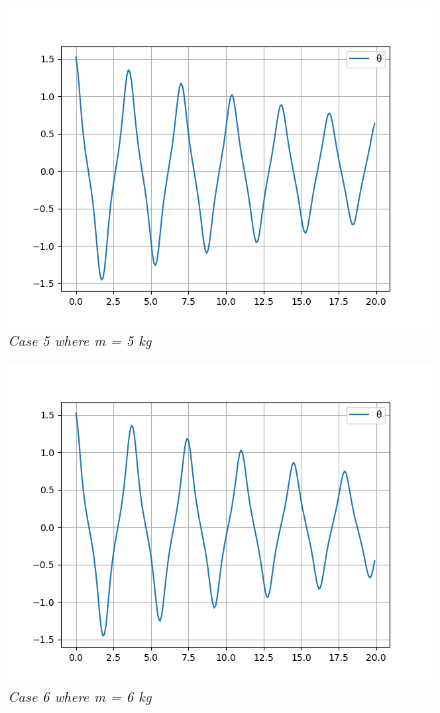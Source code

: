         \begin{figure}[H]
            \centering
            \includegraphics{Appendix/RExpPictures/A/am5.png}
            \caption{\textit{Case 5 where m = 5 kg}}
            \label{}
        \end{figure}
            
        \begin{figure}[H]
            \centering
            \includegraphics{Appendix/RExpPictures/A/am6.png}
            \caption{\textit{Case 6 where m = 6 kg}}
            \label{}
        \end{figure}
            
